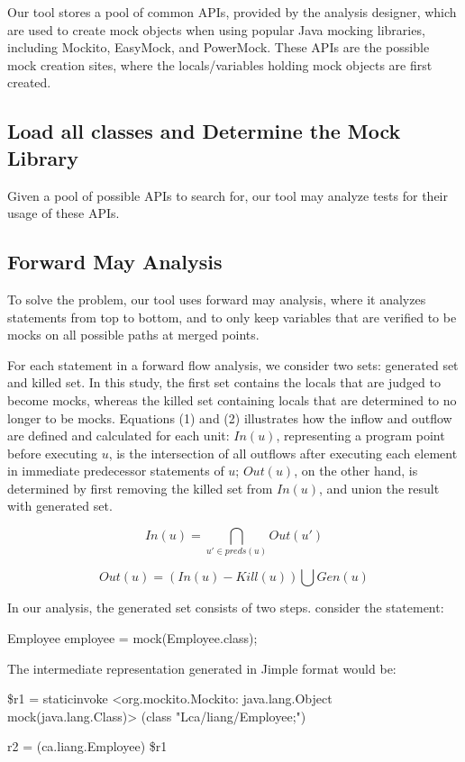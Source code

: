 Our tool stores a pool of common APIs, provided by the analysis designer, which are used to create mock objects when using popular Java mocking libraries, including Mockito, EasyMock, and PowerMock. These APIs are the possible mock creation sites, where the locals/variables holding mock objects are first created.

\subsection{Load all classes and Determine the Mock Library}
\label{subsec:library}

Given a pool of possible APIs to search for, our tool may analyze tests for their usage of these APIs.%


\subsection{Forward May Analysis}
\label{subsec:forward}

To solve the problem, our tool uses forward may analysis, where it analyzes statements from top to bottom, and to only keep variables that are verified to be mocks on all possible paths at merged points. 

For each statement in a forward flow analysis, we consider two sets: generated set and killed set. In this study, the first set contains the locals that are judged to become mocks, whereas the killed set containing locals that are determined to no longer to be mocks. Equations (1) and (2) illustrates how the inflow and outflow are defined and calculated for each unit: $In(u)$, representing a program point before executing $u$, is the intersection of all outflows after executing each element in immediate predecessor statements of $u$; $Out(u)$, on the other hand, is determined by first removing the killed set from $In(u)$, and union the result with generated set. 

\begin{equation}
In(u) = \bigcap_{u' \in preds(u)} Out(u') 
\end{equation}

\begin{equation}
Out(u) = (In(u) - Kill(u)) \bigcup Gen(u) 
\end{equation}

In our analysis, the generated set consists of two steps. consider the statement: 
\begin{verbatim*}
Employee employee = mock(Employee.class);
\end{verbatim*}
The intermediate representation generated in Jimple format would be:
\begin{verbatim*}
\$r1 = staticinvoke <org.mockito.Mockito: 
java.lang.Object mock(java.lang.Class)>
(class "Lca/liang/Employee;")

r2 = (ca.liang.Employee) \$r1
\end{verbatim*}

